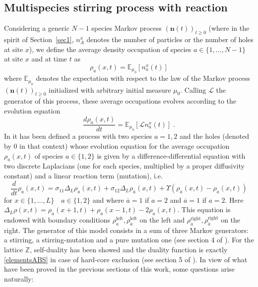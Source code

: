 \documentclass[10pt]{article}
\numberwithin{equation}{section}
\numberwithin{equation}{subsection}
\newcommand{\dt}{\;.}
\begin{document}
{\subsection{Multispecies stirring process with reaction} \label{Subsection-RD}
{\color{black}  Considering a generic $N-1$ species Markov process $(\bm{n}(t))_{t\geq 0}$ (where in the spirit of Section~\ref{sec1}, $n_{A}^{x}$ denotes the number of particles or the number of holes at site $x$), we define the average density occupation of species $a\in\{1,\ldots,N-1\}$ at site $x$ and at time $t$ as
\begin{equation}
	\rho_{a}(x,t)=\mathbb{E}_{\mu_{0}}\left[n_{a}^{x}(t)\right]
\end{equation}
where $\mathbb{E}_{\mu_{0}}$ denotes the expectation with respect to the law of the Markov process $(\bm{n}(t))_{t\geq 0}$ initialized with arbitrary initial measure $\mu_{0}$. Calling
$\mathcal{L}$ the generator of this process, these average occupations evolves according to the evolution equation
\begin{equation}\label{EE-density}
	\frac{d \rho_{a}(x,t)}{dt}=\mathbb{E}_{\mu_{0}}\left[\mathcal{L}n_{a}^{x}(t)\right]\dt
\end{equation} }
In \cite{casini2022uphill} {\color{black}it has been defined a process with two species $a=1,2$ and the holes (denoted by $0$ in that context)} whose evolution equation for the average occupation $\rho_{a}(x,t)$ of species $a\in \{1,2\}$ is given by a difference-differential equation with two discrete Laplacians (one for each species, multiplied by a proper diffusivity constant) and a linear reaction term (mutation), i.e.
\begin{equation}\label{2SpeciesRD}
	\frac{d}{dt} \rho_{a}(x,t)=\sigma_{11}\Delta_{L}\rho_{a}(x,t)+\sigma_{12}\Delta_{L}\rho_{\overline{a}}(x,t)+\Upsilon\left(\rho_{\overline{a}}(x,t)-\rho_{a}(x,t)\right)
\end{equation} 
for $ x\in\{1,\ldots,L\}\quad a\in\{1,2\}$  and where $\overline{a}=1$ if $a=2$ and $\overline{a}=1$ if $a=2$. Here $\Delta_{L}\rho(x,t)=\rho_{a}(x+1,t)+\rho_{a}(x-1,t)-2\rho_{a}(x,t)$.
This equation is endowed with boundary conditions $\rho_{a}^{\text{left}},\rho_{\overline{a}}^{\text{left}}$ on the left and $\rho_{a}^{\text{right}},\rho_{\overline{a}}^{\text{right}}$ on the right. 
The generator of this model consists in a sum of three Markov generators: a stirring, a stirring-mutation and a pure mutation one (see section 4 of \cite{casini2022uphill}). For the lattice $\mathbb{Z}$, self-duality has been showed and the duality function is exactly \eqref{elementsABS} in case of hard-core exclusion (see section 5 of \cite{casini2022uphill}). In view of what have been proved in the previous sections of this work, some questions arise naturally:
}
\end{document}
